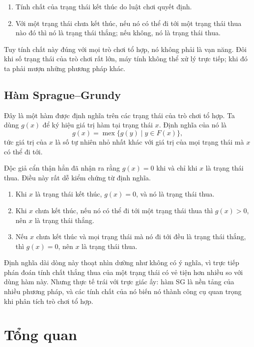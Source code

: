 \documentclass[11pt]{article}
\newcommand{\mex}{\operatorname{mex}}
\begin{document}
\begin{enumerate}
  \item Tính chất của trạng thái kết thúc do luật chơi quyết định.
  \item Với một trạng thái chưa kết thúc, nếu nó có thể đi tới một trạng thái
  thua nào đó thì nó là trạng thái thắng; nếu không, nó là trạng thái thua.
\end{enumerate}

Tuy tính chất này đúng với mọi trò chơi tổ hợp, nó không phải là vạn năng. Đôi
khi số trạng thái của trò chơi rất lớn, máy tính không thể xử lý trực tiếp; khi
đó ta phải mượn những phương pháp khác.

\subsection{Hàm Sprague--Grundy}

Đây là một hàm được định nghĩa trên các trạng thái của trò chơi tổ hợp. Ta dùng
\(g(x)\) để ký hiệu giá trị hàm tại trạng thái \(x\). Định nghĩa của nó là
\[
  g(x)=\mex\{g(y)\mid y\in F(x)\},
\]
tức giá trị của \(x\) là số tự nhiên nhỏ nhất khác với giá trị của mọi trạng
thái mà \(x\) có thể đi tới.

Độc giả cẩn thận hẳn đã nhận ra rằng \(g(x)=0\) khi và chỉ khi \(x\) là trạng
thái thua. Điều này rất dễ kiểm chứng từ định nghĩa.

\begin{enumerate}
  \item Khi \(x\) là trạng thái kết thúc, \(g(x)=0\), và nó là trạng thái thua.
  \item Khi \(x\) chưa kết thúc, nếu nó có thể đi tới một trạng thái thua thì
  \(g(x)>0\), nên \(x\) là trạng thái thắng.
  \item Nếu \(x\) chưa kết thúc và mọi trạng thái mà nó đi tới đều là trạng thái
  thắng, thì \(g(x)=0\), nên \(x\) là trạng thái thua.
\end{enumerate}

Định nghĩa dài dòng này thoạt nhìn dường như không có ý nghĩa, vì trực tiếp
phán đoán tính chất thắng thua của một trạng thái có vẻ tiện hơn nhiều so với
dùng hàm này. Nhưng thực tế trái với trực giác ấy: hàm SG là nền tảng của nhiều
phương pháp, và các tính chất của nó biến nó thành công cụ quan trọng khi phân
tích trò chơi tổ hợp.

\section{Tổng quan}
\end{document}
